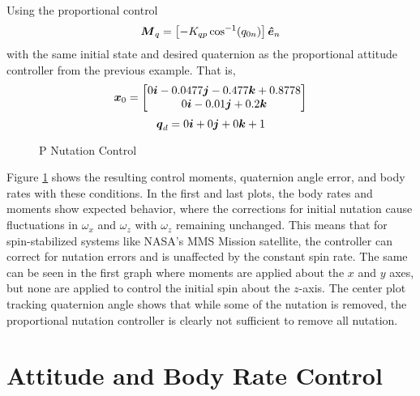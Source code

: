 Using the proportional control
\begin{equation}
  \boldsymbol{M}_{q} = \left[- K_{qp} \cos^{-1} (q_{0n}) \right] \boldsymbol{\hat{e}}_n
  \label{eqn:PNutationControl}
\end{equation}
with the same initial state and desired quaternion as the proportional attitude controller from the previous example.  That is,
\begin{equation}
  \boldsymbol{x}_0 = \begin{bmatrix} 0 \boldsymbol{i} -0.0477 \boldsymbol{j} -0.477 \boldsymbol{k} +0.8778 \\ 0 \boldsymbol{i} -0.01 \boldsymbol{j} +0.2 \boldsymbol{k} \end{bmatrix}
\end{equation}
\begin{equation}
  \boldsymbol{q}_d = 0 \boldsymbol{i} +0 \boldsymbol{j} +0 \boldsymbol{k} + 1
\end{equation}
\begin{figure}[H]
  \centerline{}
  \caption{P Nutation Control}
  \label{fig:PNutationControl}
\end{figure}
Figure \ref{fig:PNutationControl} shows the resulting control moments, quaternion angle error, and body rates with these conditions.  In the first and last plots, the body rates and moments show expected behavior, where the corrections for initial nutation cause fluctuations in $\omega_x$ and $\omega_z$ with $\omega_z$ remaining unchanged.  This means that for spin-stabilized systems like NASA's MMS Mission satellite, the controller can correct for nutation errors and is unaffected by the constant spin rate.  The same can be seen in the first graph where moments are applied about the $x$ and $y$ axes, but none are applied to control the initial spin about the $z$-axis.
The center plot tracking quaternion angle shows that while some of the nutation is removed, the proportional nutation controller is clearly not sufficient to remove all nutation.


\section{Attitude and Body Rate Control}
\label{sec:AttitudeandBodyRateControl}

